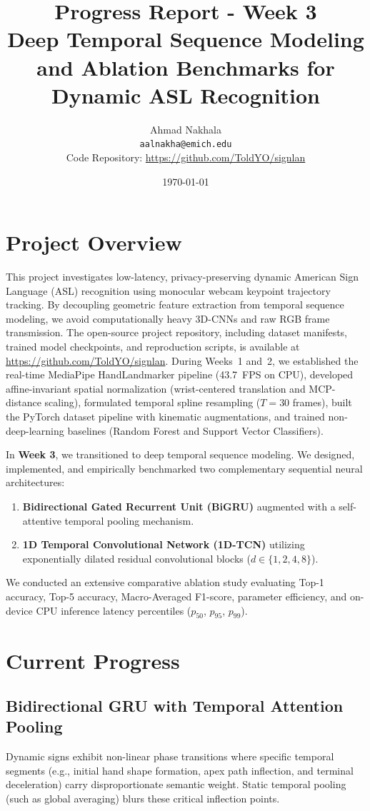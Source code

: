 \documentclass{article}
\title{Progress Report - Week 3\\
\large Deep Temporal Sequence Modeling and Ablation Benchmarks for Dynamic ASL Recognition}
\author{
  Ahmad Nakhala \\
  \texttt{aalnakha@emich.edu} \\
  \vspace{0.3em}
  \normalsize Code Repository: \url{https://github.com/ToldYO/signlan}
}
\date{\today}
\begin{document}
\maketitle

\section*{Project Overview}
This project investigates low-latency, privacy-preserving dynamic American Sign Language (ASL) recognition using monocular webcam keypoint trajectory tracking. By decoupling geometric feature extraction from temporal sequence modeling, we avoid computationally heavy 3D-CNNs and raw RGB frame transmission. The open-source project repository, including dataset manifests, trained model checkpoints, and reproduction scripts, is available at \url{https://github.com/ToldYO/signlan}. During Weeks~1 and~2, we established the real-time MediaPipe HandLandmarker pipeline (43.7~FPS on CPU), developed affine-invariant spatial normalization (wrist-centered translation and MCP-distance scaling), formulated temporal spline resampling ($T = 30$ frames), built the PyTorch dataset pipeline with kinematic augmentations, and trained non-deep-learning baselines (Random Forest and Support Vector Classifiers).

In \textbf{Week 3}, we transitioned to deep temporal sequence modeling. We designed, implemented, and empirically benchmarked two complementary sequential neural architectures:
\begin{enumerate}
    \item \textbf{Bidirectional Gated Recurrent Unit (BiGRU)} augmented with a self-attentive temporal pooling mechanism.
    \item \textbf{1D Temporal Convolutional Network (1D-TCN)} utilizing exponentially dilated residual convolutional blocks ($d \in \{1, 2, 4, 8\}$).
\end{enumerate}
We conducted an extensive comparative ablation study evaluating Top-1 accuracy, Top-5 accuracy, Macro-Averaged F1-score, parameter efficiency, and on-device CPU inference latency percentiles ($p_{50}$, $p_{95}$, $p_{99}$).

\section*{Current Progress}

\subsection*{Bidirectional GRU with Temporal Attention Pooling}
Dynamic signs exhibit non-linear phase transitions where specific temporal segments (e.g., initial hand shape formation, apex path inflection, and terminal deceleration) carry disproportionate semantic weight. Static temporal pooling (such as global averaging) blurs these critical inflection points.
\end{document}
